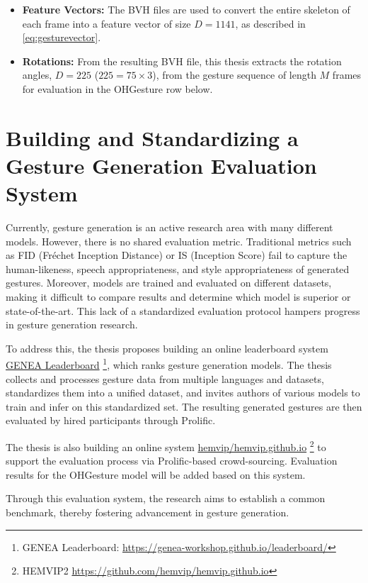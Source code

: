 \begin{itemize}[]
	\item \textbf{Feature Vectors:} The BVH files are used to convert the entire skeleton of each frame into a feature vector of size $D = 1141$, as described in \autoref{eq:gesturevector}.
	
	\item \textbf{Rotations:} From the resulting BVH file, this thesis extracts the rotation angles, $D = 225$ ($225 = 75 \times 3$), from the gesture sequence of length $M$ frames for evaluation in the OHGesture row below.
\end{itemize}

\section{Building and Standardizing a Gesture Generation Evaluation System}

Currently, gesture generation is an active research area with many different models. However, there is no shared evaluation metric. Traditional metrics such as FID (Fréchet Inception Distance) or IS (Inception Score) fail to capture the human-likeness, speech appropriateness, and style appropriateness of generated gestures. Moreover, models are trained and evaluated on different datasets, making it difficult to compare results and determine which model is superior or state-of-the-art. This lack of a standardized evaluation protocol hampers progress in gesture generation research.

To address this, the thesis proposes building an online leaderboard system \cite{nagy2024towards} \hyperlink{https://genea-workshop.github.io/leaderboard/}{GENEA Leaderboard} \footnote{GENEA Leaderboard: \url{https://genea-workshop.github.io/leaderboard/}}, which ranks gesture generation models. The thesis collects and processes gesture data from multiple languages and datasets, standardizes them into a unified dataset, and invites authors of various models to train and infer on this standardized set. The resulting generated gestures are then evaluated by hired participants through Prolific. 

The thesis is also building an online system \hyperlink{https://github.com/hemvip/hemvip.github.io}{hemvip/hemvip.github.io} \footnote{HEMVIP2 \url{https://github.com/hemvip/hemvip.github.io}} to support the evaluation process via Prolific-based crowd-sourcing. Evaluation results for the OHGesture model will be added based on this system.

Through this evaluation system, the research aims to establish a common benchmark, thereby fostering advancement in gesture generation.

